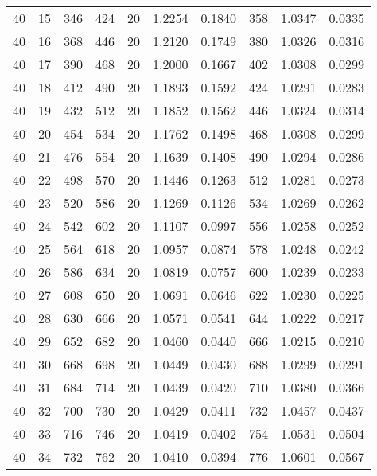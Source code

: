 \documentclass[a4paper,twopages]{article}
\begin{document}
\begin{table*}
{\begin{tabular}{|r|r|r||r|r|r|r||r|r|r|}
       40 &15 &    346 &    424 &    20 &   1.2254 &  0.1840 &  358 &   1.0347 &  0.0335\\
       40 &16 &    368 &    446 &    20 &   1.2120 &  0.1749 &  380 &   1.0326 &  0.0316\\
       40 &17 &    390 &    468 &    20 &   1.2000 &  0.1667 &  402 &   1.0308 &  0.0299\\
       40 &18 &    412 &    490 &    20 &   1.1893 &  0.1592 &  424 &   1.0291 &  0.0283\\
       40 &19 &    432 &    512 &    20 &   1.1852 &  0.1562 &  446 &   1.0324 &  0.0314\\
       40 &20 &    454 &    534 &    20 &   1.1762 &  0.1498 &  468 &   1.0308 &  0.0299\\
       40 &21 &    476 &    554 &    20 &   1.1639 &  0.1408 &  490 &   1.0294 &  0.0286\\
       40 &22 &    498 &    570 &    20 &   1.1446 &  0.1263 &  512 &   1.0281 &  0.0273\\
       40 &23 &    520 &    586 &    20 &   1.1269 &  0.1126 &  534 &   1.0269 &  0.0262\\
       40 &24 &    542 &    602 &    20 &   1.1107 &  0.0997 &  556 &   1.0258 &  0.0252\\
       40 &25 &    564 &    618 &    20 &   1.0957 &  0.0874 &  578 &   1.0248 &  0.0242\\
       40 &26 &    586 &    634 &    20 &   1.0819 &  0.0757 &  600 &   1.0239 &  0.0233\\
       40 &27 &    608 &    650 &    20 &   1.0691 &  0.0646 &  622 &   1.0230 &  0.0225\\
       40 &28 &    630 &    666 &    20 &   1.0571 &  0.0541 &  644 &   1.0222 &  0.0217\\
       40 &29 &    652 &    682 &    20 &   1.0460 &  0.0440 &  666 &   1.0215 &  0.0210\\
       40 &30 &    668 &    698 &    20 &   1.0449 &  0.0430 &  688 &   1.0299 &  0.0291\\
       40 &31 &    684 &    714 &    20 &   1.0439 &  0.0420 &  710 &   1.0380 &  0.0366\\
       40 &32 &    700 &    730 &    20 &   1.0429 &  0.0411 &  732 &   1.0457 &  0.0437\\
       40 &33 &    716 &    746 &    20 &   1.0419 &  0.0402 &  754 &   1.0531 &  0.0504\\
       40 &34 &    732 &    762 &    20 &   1.0410 &  0.0394 &  776 &   1.0601 &  0.0567\\

\end{tabular}}
\end{table*}
\end{document}
